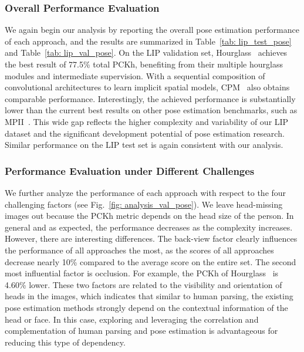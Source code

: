 \documentclass[10pt,journal,compsoc]{IEEEtran}
\begin{document}
\subsubsection{Overall Performance Evaluation}
We again begin our analysis by reporting the overall pose estimation performance of each approach, and the results are summarized in Table~\ref{tab: lip_test_pose} and Table~\ref{tab: lip_val_pose}. On the LIP validation set, Hourglass~\cite{newell2016stacked} achieves the best result of 77.5\%
total PCKh, benefiting from their multiple hourglass modules and intermediate supervision. With a sequential composition of convolutional architectures to learn implicit spatial models, CPM~\cite{Wei_2016_CVPR} also obtains comparable performance. Interestingly, the achieved performance is substantially lower than the current best results on other pose estimation benchmarks, such as MPII~\cite{andriluka14cvpr}. This wide gap reflects the higher complexity and variability of our LIP dataset and the significant development potential of pose estimation research. Similar performance on the LIP test set is again consistent with our analysis.

\subsubsection{Performance Evaluation under Different Challenges}

We further analyze the performance of each approach with respect to the four challenging factors (see Fig.~\ref{fig: analysis_val_pose}). We leave head-missing images out because the PCKh metric depends on the head size of the person. In general and as expected, the performance decreases as the complexity increases. However, there are interesting differences. The back-view factor clearly influences the performance of all approaches the most, as the scores of all approaches decrease nearly 10\% compared to the average score on the entire set. The second most influential factor is occlusion. For example, the PCKh of Hourglass~\cite{newell2016stacked} is 4.60\% lower. These two factors are related to the visibility and orientation of heads in the images, which indicates that similar to human parsing, the existing pose estimation methods strongly depend on the contextual information of the head or face. In this case, exploring and leveraging the correlation and complementation of human parsing and pose estimation is advantageous for reducing this type of dependency. 
\end{document}
